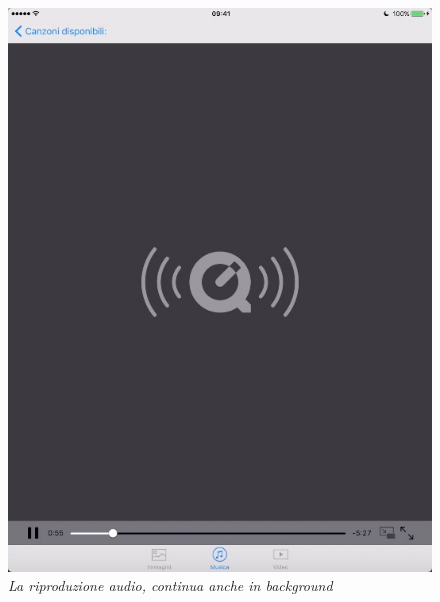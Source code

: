 \begin{figure}[H]
      \centering
      \includegraphics[scale=0.70]{immagini/app_audio.jpg}
            \vspace{0.8cm}
            \caption{\textit{La riproduzione audio, continua anche in background}}
\end{figure}
